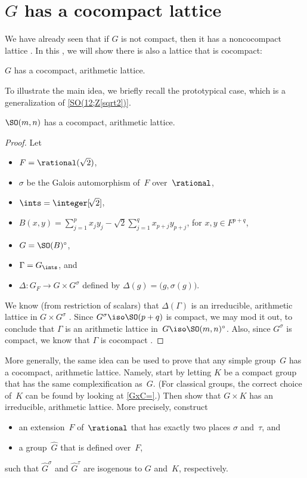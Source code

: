 \section{\texorpdfstring{$G$}{G} has a cocompact lattice}
 \label{CocptSect}

We have already seen that if $G$ is not compact, then it has a noncocompact lattice . In this , we will show there is also a lattice that is cocompact:

\begin{thm} \label{GHasCpctLatt}
 $G$ has a cocompact, arithmetic lattice.
\end{thm}

To illustrate the main idea, we briefly recall the prototypical case, which is a generalization of \cref{SO(12;Z[sqrt2])}.

\begin{prop} \label{SOmnHasCocpct}
 $\SO(m,n)$ has a cocompact, arithmetic lattice.
 \end{prop}

\begin{proof}
 Let 
 \noprelistbreak
 \begin{itemize}
 \item $F = \rational(\sqrt{2})$,
 \item $\sigma$ be the Galois automorphism of~$F$
over~$\rational$,
 \item $\ints = \integer[\!\sqrt{2}]$, 
 \item $B(x,y) = \sum_{j=1}^p x_j y_j - \sqrt{2}
\sum_{j=1}^q x_{p+j} y_{p+j}$, for $x,y \in F^{p+q}$,
 \item $G = \SO(B)^\circ$,
 \item $\Gamma = G_{\ints}$, and
 \item $\Delta \colon G_F \to G \times G^\sigma$ defined by
$\Delta(g) = \bigl( g, \sigma(g) \bigr)$.
 \end{itemize}
 We know (from restriction of scalars) that $\Delta(\Gamma)$
is an irreducible, arithmetic lattice in $G \times G^\sigma$
. Since $G^\sigma \iso \SO(p+q)$ is
compact, we may mod it out, to conclude that $\Gamma$ is an
arithmetic lattice in~$G \iso \SO(m,n)^\circ$. Also, since
$G^\sigma$ is compact, we know that $\Gamma$ is cocompact
.
 \end{proof}
 
 
More generally, the same idea can be used to prove that any simple group~$G$ has a
cocompact, arithmetic lattice. Namely, start by letting $K$ be a compact group that has the same complexification as~$G$. (For classical groups, the correct choice of~$K$ can be found by looking at \cref{GxC=}.) Then show that $G \times K$
has an irreducible, arithmetic lattice. More precisely, construct 
	\begin{itemize}
	\item an extension~$F$ of~$\rational$ that has exactly two places $\sigma$ and~$\tau$, 
	and 
	\item a group~$\widehat G$ that is defined over~$F$, 
	\end{itemize}
such that $\widehat G^\sigma$ and $\widehat G^\tau$ are isogenous to $G$ and~$K$, respectively.

